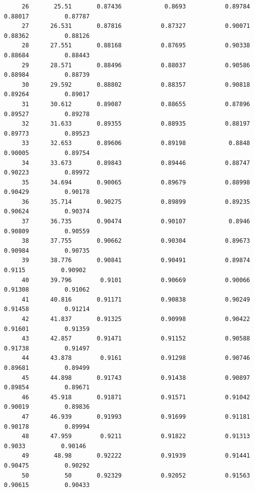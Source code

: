 \documentclass[
]{book}
\begin{document}
\begin{verbatim}
     26       25.51       0.87436            0.8693           0.89784           0.88017          0.87787   
     27      26.531       0.87816           0.87327           0.90071           0.88362          0.88126   
     28      27.551       0.88168           0.87695           0.90338           0.88684          0.88443   
     29      28.571       0.88496           0.88037           0.90586           0.88984          0.88739   
     30      29.592       0.88802           0.88357           0.90818           0.89264          0.89017   
     31      30.612       0.89087           0.88655           0.87896           0.89527          0.89278   
     32      31.633       0.89355           0.88935           0.88197           0.89773          0.89523   
     33      32.653       0.89606           0.89198            0.8848           0.90005          0.89754   
     34      33.673       0.89843           0.89446           0.88747           0.90223          0.89972   
     35      34.694       0.90065           0.89679           0.88998           0.90429          0.90178   
     36      35.714       0.90275           0.89899           0.89235           0.90624          0.90374   
     37      36.735       0.90474           0.90107            0.8946           0.90809          0.90559   
     38      37.755       0.90662           0.90304           0.89673           0.90984          0.90735   
     39      38.776       0.90841           0.90491           0.89874            0.9115          0.90902   
     40      39.796        0.9101           0.90669           0.90066           0.91308          0.91062   
     41      40.816       0.91171           0.90838           0.90249           0.91458          0.91214   
     42      41.837       0.91325           0.90998           0.90422           0.91601          0.91359   
     43      42.857       0.91471           0.91152           0.90588           0.91738          0.91497   
     44      43.878        0.9161           0.91298           0.90746           0.89681          0.89499   
     45      44.898       0.91743           0.91438           0.90897           0.89854          0.89671   
     46      45.918       0.91871           0.91571           0.91042           0.90019          0.89836   
     47      46.939       0.91993           0.91699           0.91181           0.90178          0.89994   
     48      47.959        0.9211           0.91822           0.91313            0.9033          0.90146   
     49       48.98       0.92222           0.91939           0.91441           0.90475          0.90292   
     50          50       0.92329           0.92052           0.91563           0.90615          0.90433   
\end{verbatim}
\end{document}
